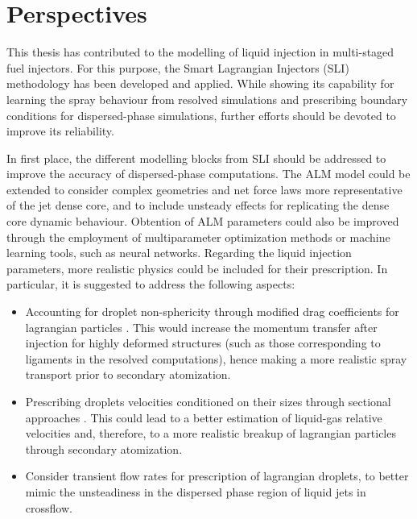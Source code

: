 \clearpage



\section*{Perspectives}

This thesis has contributed to the modelling of liquid injection in multi-staged fuel injectors. For this purpose, the Smart Lagrangian Injectors (SLI) methodology has been developed and applied. While showing its capability for learning the spray behaviour from resolved simulations and prescribing boundary conditions for dispersed-phase simulations, further efforts should be devoted to improve its reliability. 

In first place, the different modelling blocks from SLI should be addressed to improve the accuracy of dispersed-phase computations. The ALM model could be extended to consider complex geometries and net force laws more representative of the jet dense core, and to include unsteady effects for replicating the dense core dynamic behaviour. Obtention of ALM parameters could also be improved through the employment of multiparameter optimization methods or machine learning tools, such as neural networks. Regarding the liquid injection parameters, more realistic physics could be included for their prescription. In particular, it is suggested to address the following aspects:

\begin{itemize}
	
		\item Accounting for droplet non-sphericity through modified drag coefficients for lagrangian particles . This would increase the momentum transfer after injection for highly deformed structures (such as those corresponding to ligaments in the resolved computations), hence making a more realistic spray transport prior to secondary atomization. 
		
		\item Prescribing droplets velocities conditioned on their sizes through sectional approaches . This could lead to a better estimation of liquid-gas relative velocities and, therefore, to a more realistic breakup of lagrangian particles through secondary atomization.
		
		\item Consider transient flow rates for prescription of lagrangian droplets, to better mimic the unsteadiness in the dispersed phase region of liquid jets in crossflow.
	
\end{itemize}

